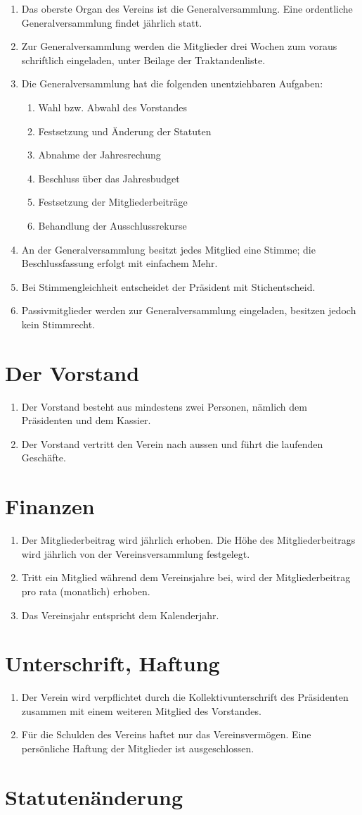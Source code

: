 \documentclass[10pt,a4paper,parskip,fleqn]{scrartcl}
\newcommand{\ol}{\begin{enumerate}[itemsep=-0.2em,topsep=-0.2em]}
\newcommand{\lo}{\end{enumerate}}
\newcommand{\li}{\item}
\begin{document}
\ol
	\li Das oberste Organ des Vereins ist die Generalversammlung. Eine ordentliche
	Generalversammlung findet jährlich statt.
	\li Zur Generalversammlung werden die Mitglieder drei Wochen zum voraus
	schriftlich eingeladen, unter Beilage der Traktandenliste.
	\li Die Generalversammlung hat die folgenden unentziehbaren Aufgaben:
		\ol
			\li Wahl bzw. Abwahl des Vorstandes
			\li Festsetzung und Änderung der Statuten
			\li Abnahme der Jahresrechung
			\li Beschluss über das Jahresbudget
			\li Festsetzung der Mitgliederbeiträge
			\li Behandlung der Ausschlussrekurse
		\lo
	\li An der Generalversammlung besitzt jedes Mitglied eine Stimme; die
	Beschlussfassung erfolgt mit einfachem Mehr.
	\li Bei Stimmengleichheit entscheidet der Präsident mit Stichentscheid.
	\li Passivmitglieder werden zur Generalversammlung eingeladen, besitzen jedoch
	kein Stimmrecht.
\lo


\section{Der Vorstand}

\ol
	\li Der Vorstand besteht aus mindestens zwei Personen, nämlich dem Präsidenten
	und dem Kassier.
	\li Der Vorstand vertritt den Verein nach aussen und führt die laufenden
	Geschäfte.
\lo


\section{Finanzen}

\ol
	\li Der Mitgliederbeitrag wird jährlich erhoben. Die Höhe des
	Mitgliederbeitrags wird jährlich von der Vereinsversammlung festgelegt.
	\li Tritt ein Mitglied während dem Vereinsjahre bei, wird der Mitgliederbeitrag
	pro rata (monatlich) erhoben.
	\li Das Vereinsjahr entspricht dem Kalenderjahr.
\lo


\section{Unterschrift, Haftung}

\ol
	\li Der Verein wird verpflichtet durch die Kollektivunterschrift des
	Präsidenten zusammen mit einem weiteren Mitglied des Vorstandes.
	\li Für die Schulden des Vereins haftet nur das Vereinsvermögen. Eine
	persönliche Haftung der Mitglieder ist ausgeschlossen.
\lo


\section{Statutenänderung}
\end{document}

